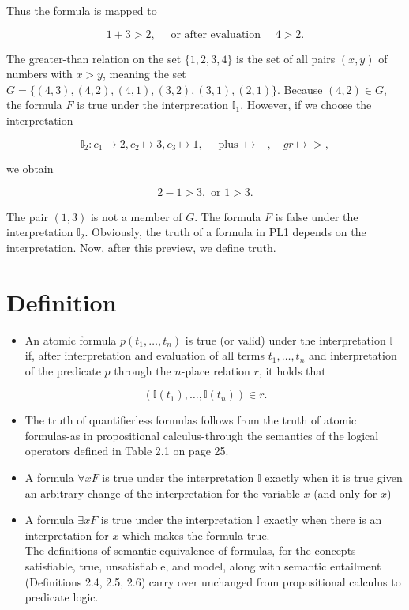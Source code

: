 \documentclass[10pt]{book}
\begin{document}
Thus the formula is mapped to

$$
1+3>2, \quad \text { or after evaluation } \quad 4>2 .
$$

The greater-than relation on the set $\{1,2,3,4\}$ is the set of all pairs $(x, y)$ of numbers with $x>y$, meaning the set $G=\{(4,3),(4,2),(4,1),(3,2),(3,1),(2,1)\}$. Because $(4,2) \in G$, the formula $F$ is true under the interpretation $\mathbb{I}_{1}$. However, if we choose the interpretation

$$
\mathbb{I}_{2}: c_{1} \mapsto 2, c_{2} \mapsto 3, c_{3} \mapsto 1, \quad \text { plus } \mapsto-, \quad g r \mapsto>,
$$

we obtain

$$
2-1>3, \text { or } 1>3 .
$$

The pair $(1,3)$ is not a member of $G$. The formula $F$ is false under the interpretation $\mathbb{I}_{2}$. Obviously, the truth of a formula in PL1 depends on the interpretation. Now, after this preview, we define truth.

\section{Definition}
\begin{itemize}
  \item An atomic formula $p\left(t_{1}, \ldots, t_{n}\right)$ is true (or valid) under the interpretation $\mathbb{I}$ if, after interpretation and evaluation of all terms $t_{1}, \ldots, t_{n}$ and interpretation of the predicate $p$ through the $n$-place relation $r$, it holds that
\end{itemize}
$$
\left(\mathbb{I}\left(t_{1}\right), \ldots, \mathbb{I}\left(t_{n}\right)\right) \in r.
$$

\begin{itemize}
  \item The truth of quantifierless formulas follows from the truth of atomic formulas-as in propositional calculus-through the semantics of the logical operators defined in Table 2.1 on page 25.
  \item A formula $\forall x F$ is true under the interpretation $\mathbb{I}$ exactly when it is true given an arbitrary change of the interpretation for the variable $x$ (and only for $x$)
  \item A formula $\exists x F$ is true under the interpretation $\mathbb{I}$ exactly when there is an interpretation for $x$ which makes the formula true.\\
The definitions of semantic equivalence of formulas, for the concepts satisfiable, true, unsatisfiable, and model, along with semantic entailment (Definitions 2.4, 2.5, 2.6) carry over unchanged from propositional calculus to predicate logic.
\end{itemize}
\end{document}
